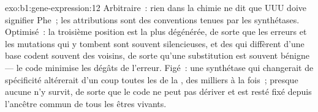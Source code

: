 \begin{solution}{exo:b1:gene-expression:12}
Arbitraire~: rien dans la chimie ne dit que UUU doive signifier Phe~;
les attributions sont des conventions tenues par les synthétases.
Optimisé~: la troisième position est la plus dégénérée, de sorte que les
erreurs et les mutations qui y tombent sont souvent silencieuses, et des
 qui diffèrent d'une base codent souvent des 
voisins, de sorte qu'une substitution est souvent bénigne --- le code
minimise les dégâts de l'erreur. Figé~: une synthétase qui changerait de
spécificité altérerait d'un coup toutes les  de la , des
milliers à la fois~; presque aucune  n'y survit, de sorte que le
code ne peut pas dériver et est resté fixé depuis l'ancêtre commun de
tous les êtres vivants.
\end{solution}

